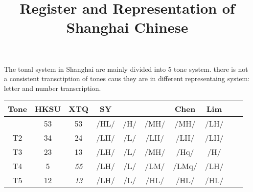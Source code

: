 \documentclass[11pt]{article}
\title{Register and Representation of Shanghai Chinese}
\begin{document}
\maketitle
The tonal system in Shanghai are mainly divided into 5 tone system. there is not a consistent transctiption of tones caus they are in different representaing system: letter and number transcription. 

\begin{table}[htbp]
	\centering
	\begin{tabular}{cccccccccc}
		\toprule
		\textbf{Tone} & HKSU &XTQ& SY  & \citet{duanmu1999metrical} &  \citet{zee1979tones}  & Chen  & Lim  &  \\ \midrule
		     \cellcolor{gray}{T1}       &   53   & 53&/HL/ &  /H/   & /MH/ & /MH/  & /LH/ &  \\
		     T2       &   34   & 24&/LH/ &  /L/   & /LH/ & /LH/  & /LH/ &  \\
		     T3       &   23   & 13&/LH/ &  /L/   & /MH/ & /Hq/  & /H/  &  \\
		     T4       &   5    & \emph{55}&/LH/ &  /L/   & /LM/ & /LMq/ & /LH/ &  \\
		     T5       &   12   & \emph{13}&/LH/ &  /L/   & /HL/ & /HL/  & /HL/ &  \\ \bottomrule
	\end{tabular}
\end{table}
\end{document}
